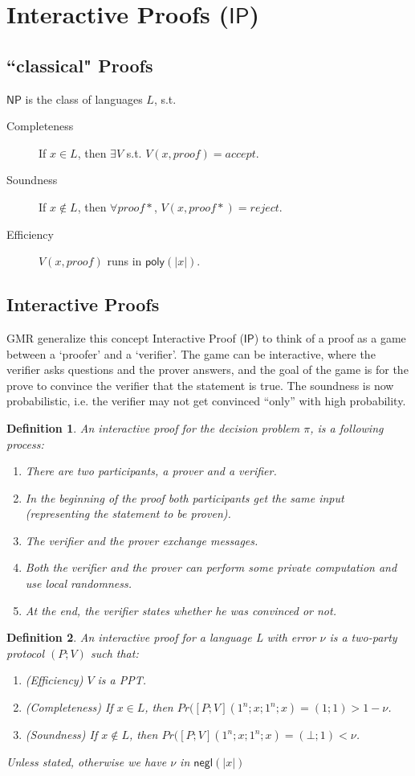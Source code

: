 \documentclass[11pt]{article}
\newcommand{\class}[1]{{\ensuremath{\mathsf{#1}}}}
\newcommand{\np}{\class{NP}}
\newcommand{\ip}{\class{IP}}
\newcommand{\negl}{\class{negl}}
\newcommand{\poly}{\class{poly}}
\newtheorem{definition}{Definition}[section]
\begin{document}
\section{Interactive Proofs ($\ip$)}
\subsection{``classical" Proofs}
$\np$ is the class of languages $L$, s.t.
\begin{description}
\item[Completeness] If $x\in L$, then $\exists V$ s.t. $V(x, proof) = accept$. 
\item[Soundness] If $x\notin L$, then $\forall proof*$, $V(x, proof*) = reject$.
\item[Efficiency] $V(x, proof)$ runs in $\poly(|x|)$.
\end{description} 
\subsection{Interactive Proofs}
GMR generalize this concept Interactive Proof ($\ip$) to think of a proof as a game between a `proofer' and a `verifier'. The game can be interactive, where the verifier asks questions and the prover answers, and the goal of the game is for the prove to convince the verifier that the statement is true. The soundness is now probabilistic, i.e. the verifier may not get convinced ``only'' with high probability.


\begin{definition}
An interactive proof for the decision problem $\pi$, is a following process:
\begin{enumerate}
\item There are two participants, a prover and a verifier.
\item In the beginning of the proof both participants get the same input (representing the statement
to be proven).
\item The verifier and the prover exchange messages.
\item Both the verifier and the prover can perform some private computation and use local randomness.
\item At the end, the verifier states whether he was convinced or not.
\end{enumerate}
\end{definition}

\begin{definition}
An interactive proof for a language L with error $\nu$ is a two-party protocol $(P;V)$ such that:
\begin{enumerate}
\item (Efficiency) $V$ is a PPT.
\item (Completeness) If $x \in L$, then $Pr([P; V](1^n; x; 1^n; x) = (1; 1) > 1 - \nu$.
\item (Soundness) If $x \notin L$, then $Pr([P; V](1^n; x; 1^n; x) = (\bot; 1) < \nu$.
\end{enumerate}
Unless stated, otherwise we have $\nu$ in $\negl(|x|)$
\end{definition}
\end{document}
